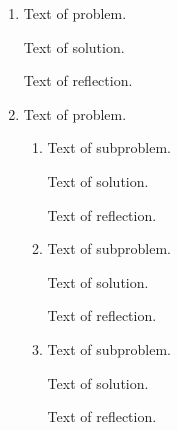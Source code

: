\documentclass[11pt]{article}
\begin{document}
\begin{enumerate}
	\item
	\begin{problem}
		Text of problem.
	\end{problem}
	\begin{solution}
		Text of solution.
	\end{solution}
	\begin{reflection}
		Text of reflection.
	\end{reflection}	

	\item
	\begin{problem}
	Text of problem.
	\end{problem}
	\begin{enumerate}
		\item
		\begin{problem}
			Text of subproblem.
		\end{problem}
		\begin{solution}
			Text of solution.
		\end{solution}
		\begin{reflection}
			Text of reflection.
		\end{reflection}	
	
		\item
		\begin{problem}
			Text of subproblem.
		\end{problem}
		\begin{solution}
			Text of solution.
		\end{solution}
		\begin{reflection}
			Text of reflection.
		\end{reflection}	
		
		\item
		\begin{problem}
			Text of subproblem.
		\end{problem}
		\begin{solution}
			Text of solution.
		\end{solution}
		\begin{reflection}
			Text of reflection.
		\end{reflection}	
	\end{enumerate}
\end{enumerate}
	
\end{document}
